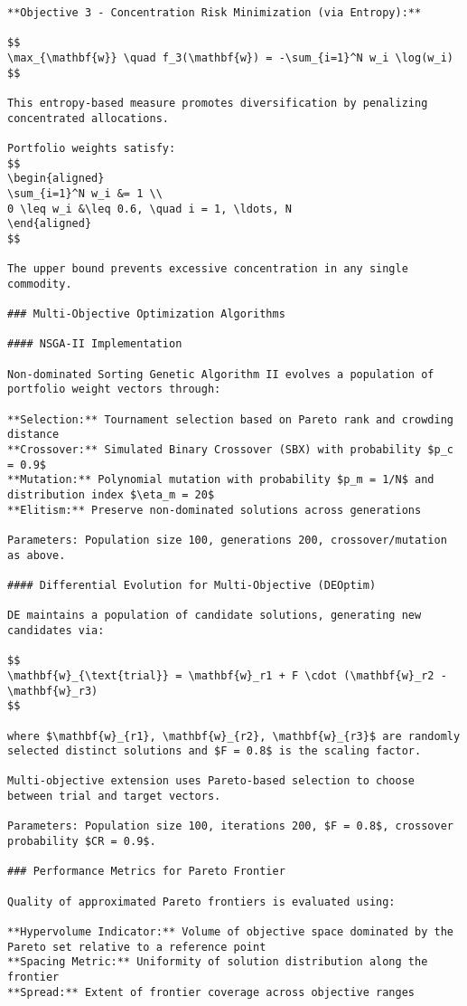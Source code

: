 \documentclass[
  10pt,
  a4paper,
]{article}
\begin{document}
\begin{tcolorbox}
\begin{verbatim}
**Objective 3 - Concentration Risk Minimization (via Entropy):**

$$
\max_{\mathbf{w}} \quad f_3(\mathbf{w}) = -\sum_{i=1}^N w_i \log(w_i)
$$

This entropy-based measure promotes diversification by penalizing concentrated allocations.

Portfolio weights satisfy:
$$
\begin{aligned}
\sum_{i=1}^N w_i &= 1 \\
0 \leq w_i &\leq 0.6, \quad i = 1, \ldots, N
\end{aligned}
$$

The upper bound prevents excessive concentration in any single commodity.

### Multi-Objective Optimization Algorithms

#### NSGA-II Implementation

Non-dominated Sorting Genetic Algorithm II evolves a population of portfolio weight vectors through:

**Selection:** Tournament selection based on Pareto rank and crowding distance  
**Crossover:** Simulated Binary Crossover (SBX) with probability $p_c = 0.9$  
**Mutation:** Polynomial mutation with probability $p_m = 1/N$ and distribution index $\eta_m = 20$  
**Elitism:** Preserve non-dominated solutions across generations

Parameters: Population size 100, generations 200, crossover/mutation as above.

#### Differential Evolution for Multi-Objective (DEOptim)

DE maintains a population of candidate solutions, generating new candidates via:

$$
\mathbf{w}_{\text{trial}} = \mathbf{w}_r1 + F \cdot (\mathbf{w}_r2 - \mathbf{w}_r3)
$$

where $\mathbf{w}_{r1}, \mathbf{w}_{r2}, \mathbf{w}_{r3}$ are randomly selected distinct solutions and $F = 0.8$ is the scaling factor.

Multi-objective extension uses Pareto-based selection to choose between trial and target vectors.

Parameters: Population size 100, iterations 200, $F = 0.8$, crossover probability $CR = 0.9$.

### Performance Metrics for Pareto Frontier

Quality of approximated Pareto frontiers is evaluated using:

**Hypervolume Indicator:** Volume of objective space dominated by the Pareto set relative to a reference point  
**Spacing Metric:** Uniformity of solution distribution along the frontier  
**Spread:** Extent of frontier coverage across objective ranges


\end{verbatim}
\end{tcolorbox}
\end{document}
